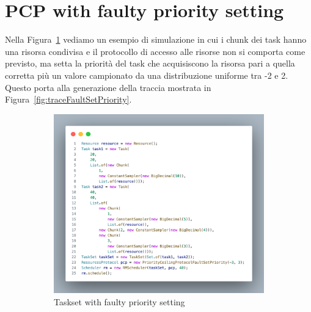 \section{PCP with faulty priority setting}
Nella Figura~\ref{fig:tasksetFaultSetPriority} vediamo un esempio di simulazione in cui i chunk dei task hanno una risorsa condivisa e il protocollo di accesso alle risorse non si comporta come previsto, ma setta la priorità del task che acquisiscono la risorsa pari a quella corretta più un valore campionato da una distribuzione uniforme tra -2 e 2. Questo porta alla generazione della traccia mostrata in Figura~\ref{fig:traceFaultSetPriority}.

\begin{figure}[htbp]
    \centering
    \begin{subfigure}{0.45\textwidth}
        \vfill
        \centering
        \includegraphics[width=.9\textwidth]{immagini/taskset fault set priority.pdf}
        \caption{Taskset with faulty priority setting}
        \label{fig:tasksetFaultSetPriority}
        \vfill
    \end{subfigure}
    \hfill
    \begin{subfigure}{0.45\textwidth}
        \vfill
        \centering
\end{subfigure}
\end{figure}
